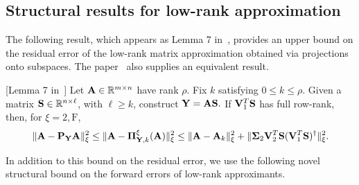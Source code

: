 \subsection{Structural results for low-rank approximation}

The following result, which appears as 
Lemma 7 in~\cite{BMD09a}, provides
an upper bound on the residual error of the low-rank 
matrix approximation obtained via projections onto subspaces. The paper~\cite{HMT11}
also supplies an equivalent result. 

\begin{lemma}
\label{chprelim:lem:structural-result}[Lemma 7 in~\cite{BMD09a}]
Let $\mathbf{A} \in \mathbb{R}^{m \times n}$ have rank $\rho.$ Fix $k$ satisfying $0 \leq k \leq \rho$.
Given a matrix $\mathbf{S} \in \mathbb{R}^{n \times \ell}$, with $\ell \ge k$, 
construct $\mathbf{Y} = \mathbf{A} \mathbf{S}.$ If $\mathbf{V}_1 ^T \mathbf{S}$ has full 
row-rank, then,
for $\xi=2, \mathrm{F}$,
\begin{equation}
\label{ch3:eqn:tropp-structural-result}
\mbox{}\|\mathbf{A} - \mathbf{P}_{\mathbf{Y}} \mathbf{A}\|_{\xi}^2
\leq
\mbox{}\|\mathbf{A} -  \boldsymbol{\Pi}_{\mathbf{Y},k}^{\xi}(\mathbf{A}) \|_{\xi}^2
\leq
\mbox{}\| \mathbf{A} - \mathbf{A}_k \|_{\xi}^2 + 
\mbox{}\|\mathbf{\Sigma}_2 \mathbf{V}_2 ^T \mathbf{S} 
( \mathbf{V}_1 ^T \mathbf{S})^\dagger \|_{\xi}^2.
\end{equation}
\end{lemma}


In addition to this bound on the residual error, we use the following novel 
structural bound on the forward errors of low-rank approximants.

